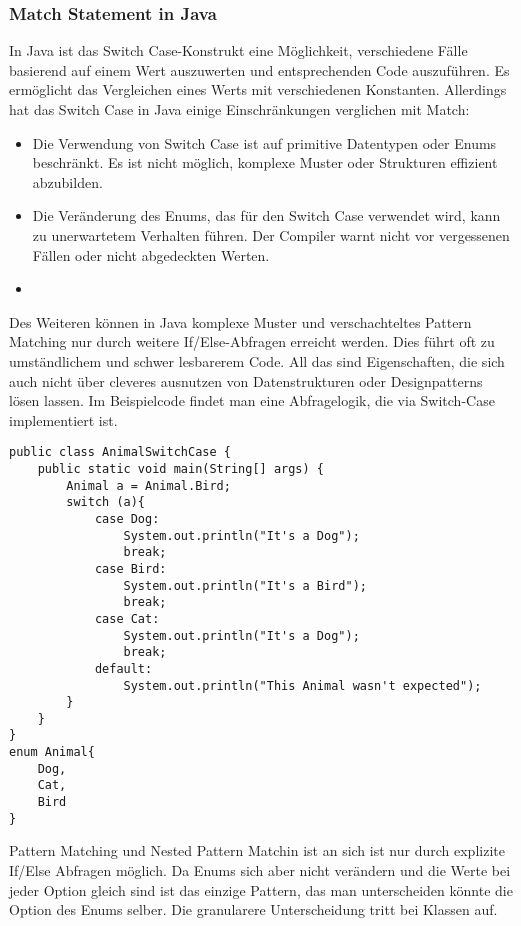 \documentclass[a4paper, 1ppt]{article}
\begin{document}
\subsubsection{Match Statement in Java}
In Java ist das Switch Case-Konstrukt eine Möglichkeit, verschiedene Fälle basierend auf einem Wert auszuwerten und entsprechenden Code auszuführen. Es ermöglicht das Vergleichen eines Werts mit verschiedenen Konstanten. Allerdings hat das Switch Case in Java einige Einschränkungen verglichen mit Match:
\begin{itemize}
	\item Die Verwendung von Switch Case ist auf primitive Datentypen oder Enums beschränkt. Es ist nicht möglich, komplexe Muster oder Strukturen effizient abzubilden.
	\item Die Veränderung des Enums, das für den Switch Case verwendet wird, kann zu unerwartetem Verhalten führen. Der Compiler warnt nicht vor vergessenen Fällen oder nicht abgedeckten Werten. 
	\item 
\end{itemize}
Des Weiteren können in Java komplexe Muster und verschachteltes Pattern Matching nur durch weitere If/Else-Abfragen erreicht werden. Dies führt oft zu umständlichem und schwer lesbarerem Code.
All das sind Eigenschaften, die sich auch nicht über cleveres ausnutzen von Datenstrukturen oder Designpatterns lösen lassen.
Im Beispielcode findet man eine Abfragelogik, die via Switch-Case implementiert ist.
\begin{verbatim}
public class AnimalSwitchCase {
    public static void main(String[] args) {
        Animal a = Animal.Bird;
        switch (a){
            case Dog:
                System.out.println("It's a Dog");
                break;
            case Bird:
                System.out.println("It's a Bird");
                break;
            case Cat:
                System.out.println("It's a Dog");
                break;
            default:
                System.out.println("This Animal wasn't expected");
        }
    }
}
enum Animal{
    Dog,
    Cat,
    Bird
}
\end{verbatim}
Pattern Matching und Nested Pattern Matchin ist an sich ist nur durch explizite If/Else Abfragen möglich. Da Enums sich aber nicht verändern und die Werte bei jeder Option gleich sind ist das einzige Pattern, das man unterscheiden könnte die Option des Enums selber. Die granularere Unterscheidung tritt bei Klassen auf.
\newpage
\end{document}
